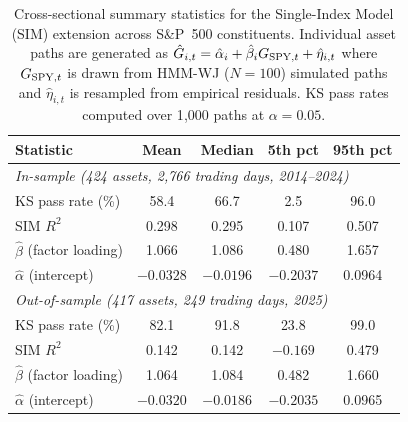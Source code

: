 \begin{table}[htpb]
\centering
\caption{Cross-sectional summary statistics for the Single-Index Model (SIM) extension
    across S\&P~500 constituents.  Individual asset paths are generated as
    $\hat{G}_{i,t}=\hat{\alpha}_i+\hat{\beta}_i G_{{\rm SPY},t}+\hat{\eta}_{i,t}$
    where $G_{{\rm SPY},t}$ is drawn from HMM-WJ ($N=100$) simulated paths
    and $\hat{\eta}_{i,t}$ is resampled from empirical residuals.
    KS pass rates computed over 1{,}000 paths at $\alpha=0.05$.}
\label{tab:multi_asset}
\begin{tabular}{@{}lcccc@{}}
\toprule
\textbf{Statistic} & \textbf{Mean} & \textbf{Median} & \textbf{5th pct} & \textbf{95th pct} \\ \midrule
\multicolumn{5}{l}{\textit{In-sample (424 assets, 2{,}766 trading days, 2014--2024)}} \\[2pt]
KS pass rate (\%)                    & 58.4   & 66.7   &  2.5   & 96.0   \\
SIM $R^2$                            &  0.298 &  0.295 &  0.107 &  0.507 \\
$\hat{\beta}$ (factor loading)       &  1.066 &  1.086 &  0.480 &  1.657 \\
$\hat{\alpha}$ (intercept)           & $-0.0328$ & $-0.0196$ & $-0.2037$ & 0.0964 \\[4pt]
\multicolumn{5}{l}{\textit{Out-of-sample (417 assets, 249 trading days, 2025)}} \\[2pt]
KS pass rate (\%)                    & 82.1   & 91.8   & 23.8   & 99.0   \\
SIM $R^2$                            &  0.142 &  0.142 & $-0.169$ &  0.479 \\
$\hat{\beta}$ (factor loading)       &  1.064 &  1.084 &  0.482 &  1.660 \\
$\hat{\alpha}$ (intercept)           & $-0.0320$ & $-0.0186$ & $-0.2035$ & 0.0965 \\ \bottomrule
\end{tabular}
\end{table}

